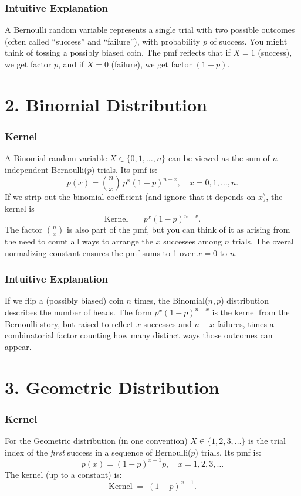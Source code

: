 \documentclass{article}
\begin{document}
\subsubsection*{Intuitive Explanation}
A Bernoulli random variable represents a single trial with two possible outcomes (often called ``success'' and ``failure''), with probability \(p\) of success. 
You might think of tossing a possibly biased coin. 
The pmf reflects that if \(X=1\) (success), we get factor \(p\), and if \(X=0\) (failure), we get factor \((1-p)\).

\section*{2. Binomial Distribution}

\subsubsection*{Kernel}
A Binomial random variable \(X \in \{0,1,\ldots,n\}\) can be viewed as the sum of \(n\) independent Bernoulli(\(p\)) trials. 
Its pmf is:
\[
p(x) = \binom{n}{x}\, p^x (1-p)^{n-x}, 
\quad x = 0,1,\ldots,n.
\]
If we strip out the binomial coefficient (and ignore that it depends on \(x\)), the kernel is 
\[
\text{Kernel} \;=\; p^x (1-p)^{n-x}.
\]
The factor \(\binom{n}{x}\) is also part of the pmf, but you can think of it as arising from the need to count all ways to arrange the \(x\) successes among \(n\) trials. The overall normalizing constant ensures the pmf sums to 1 over \(x=0\) to \(n\).

\subsubsection*{Intuitive Explanation}
If we flip a (possibly biased) coin \(n\) times, the Binomial(\(n,p\)) distribution describes the number of heads. 
The form \(p^x (1-p)^{n-x}\) is the kernel from the Bernoulli story, but raised to reflect \(x\) successes and \(n-x\) failures, times a combinatorial factor counting how many distinct ways those outcomes can appear.

\section*{3. Geometric Distribution}

\subsubsection*{Kernel}
For the Geometric distribution (in one convention) \(X \in \{1,2,3,\ldots\}\) is the trial index of the \emph{first} success in a sequence of Bernoulli(\(p\)) trials. Its pmf is:
\[
p(x) = (1-p)^{x-1} p, \quad x = 1,2,3,\ldots
\]
The kernel (up to a constant) is:
\[
\text{Kernel} \;=\; (1-p)^{x-1}.
\]
\end{document}
